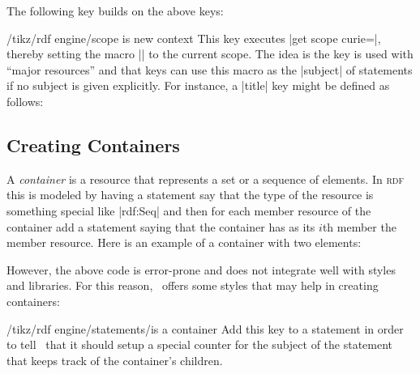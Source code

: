 The following key builds on the above keys:
%
\begin{key}{/tikz/rdf engine/scope is new context}
    This key executes |get scope curie=\tikzrdfcontext|, thereby setting the
    macro |\tikzrdfcontext| to the current scope. The idea is the key is used
    with ``major resources'' and that keys can use this macro as the |subject|
    of statements if no subject is given explicitly. For instance, a |title|
    key might be defined as follows:
\end{key}


\subsection{Creating Containers}

A \emph{container} is a resource that represents a set or a sequence of
elements. In \textsc{rdf} this is modeled by having a statement say that the
type of the resource is something special like |rdf:Seq| and then for each
member resource of the container add a statement saying that the container has
as its $i$th member the  member resource. Here is an example of a container
with two elements:
%
\begin{codeexample}
\end{codeexample}

However, the above code is error-prone and does not integrate well with styles
and libraries. For this reason, \tikzname\ offers some styles that may help in
creating containers:

\begin{key}{/tikz/rdf engine/statements/is a container}
    Add this key to a statement in order to tell \tikzname\ that it should
    setup a special counter for the subject of the statement that keeps track
    of the container's children.
\end{key}

